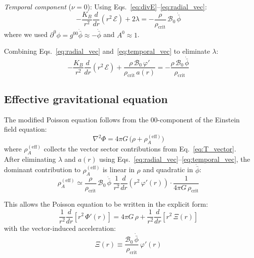 \documentclass[aps,prd,twocolumn,superscriptaddress,nofootinbib]{revtex4-2}
\begin{document}
\textit{Temporal component} ($\nu = 0$): Using Eqs.~\eqref{eq:divE}--\eqref{eq:radial_vec}:
\begin{equation}
-\frac{K_B}{r^2}\frac{d}{dr}\!\left(r^2\,\mathcal{E}\right) + 2\lambda = -\frac{\rho}{\rho_{\mathrm{crit}}}\,\mathcal{B}_0\,\dot{\bar{\phi}}
\label{eq:temporal_vec}
\end{equation}
where we used $\partial^0\phi = g^{00}\dot{\bar{\phi}} \approx -\dot{\bar{\phi}}$ and $A^0 \approx 1$.

Combining Eqs.~\eqref{eq:radial_vec} and~\eqref{eq:temporal_vec} to eliminate $\lambda$:
\begin{equation}
-\frac{K_B}{r^2}\frac{d}{dr}\!\left(r^2\,\mathcal{E}\right) + \frac{\rho\,\mathcal{B}_0\,\varphi'}{\rho_{\mathrm{crit}}\,a(r)} = -\frac{\rho\,\mathcal{B}_0\,\dot{\bar{\phi}}}{\rho_{\mathrm{crit}}}
\label{eq:combined_vec}
\end{equation}

\subsection{Effective gravitational equation}
\label{sec:mod_poisson}

The modified Poisson equation follows from the $00$-component of the Einstein field equation:
\begin{equation}
\nabla^2\Phi = 4\pi G\,\bigl(\rho + \rho^{(\mathrm{eff})}_A\bigr)
\label{eq:mod_poisson}
\end{equation}
where $\rho^{(\mathrm{eff})}_A$ collects the vector sector contributions from Eq.~\eqref{eq:T_vector}. After eliminating $\lambda$ and $a(r)$ using Eqs.~\eqref{eq:radial_vec}--\eqref{eq:temporal_vec}, the dominant contribution to $\rho^{(\mathrm{eff})}_A$ is linear in $\rho$ and quadratic in $\dot{\bar{\phi}}$:
\begin{equation}
\rho^{(\mathrm{eff})}_A \simeq \frac{\rho}{\rho_{\mathrm{crit}}}\,\mathcal{B}_0\,\dot{\bar{\phi}}\;\frac{1}{r^2}\frac{d}{dr}\!\left(r^2\,\varphi'(r)\right) \cdot \frac{1}{4\pi G\,\rho_{\mathrm{crit}}}
\label{eq:rho_eff}
\end{equation}

This allows the Poisson equation to be written in the explicit form:
\begin{equation}
\frac{1}{r^2}\frac{d}{dr}\!\left[r^2\,\Phi'(r)\right] = 4\pi G\,\rho + \frac{1}{r^2}\frac{d}{dr}\!\left[r^2\,\Xi(r)\right]
\label{eq:poisson_Xi}
\end{equation}
with the vector-induced acceleration:
\begin{equation}
\Xi(r) \equiv \frac{\mathcal{B}_0\,\dot{\bar{\phi}}}{\rho_{\mathrm{crit}}}\,\varphi'(r)
\label{eq:Xi_def}
\end{equation}
\end{document}
